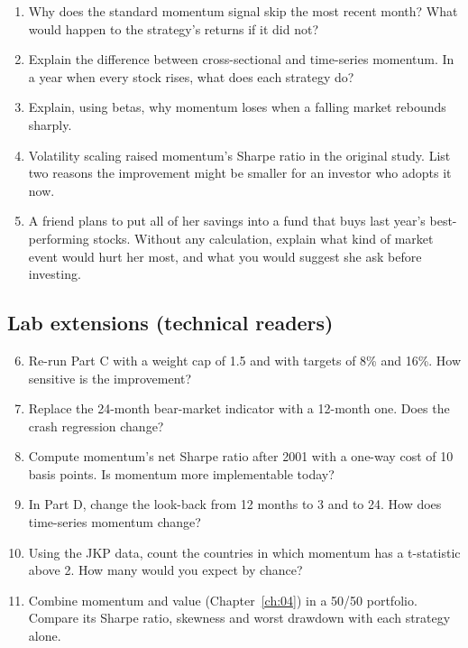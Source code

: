 \begin{enumerate}
  \item Why does the standard momentum signal skip the most recent month? What would happen to the strategy's returns if it did not?
  \item Explain the difference between cross-sectional and time-series momentum. In a year when every stock rises, what does each strategy do?
  \item Explain, using betas, why momentum loses when a falling market rebounds sharply.
  \item Volatility scaling raised momentum's Sharpe ratio in the original study. List two reasons the improvement might be smaller for an investor who adopts it now.
  \item A friend plans to put all of her savings into a fund that buys last year's best-performing stocks. Without any calculation, explain what kind of market event would hurt her most, and what you would suggest she ask before investing.
\end{enumerate}

\subsection*{Lab extensions (technical readers)}

\begin{enumerate}
  \setcounter{enumi}{5}
  \item Re-run Part C with a weight cap of 1.5 and with targets of 8\% and 16\%. How sensitive is the improvement?
  \item Replace the 24-month bear-market indicator with a 12-month one. Does the crash regression change?
  \item Compute momentum's net Sharpe ratio after 2001 with a one-way cost of 10 basis points. Is momentum more implementable today?
  \item In Part D, change the look-back from 12 months to 3 and to 24. How does time-series momentum change?
  \item Using the JKP data, count the countries in which momentum has a t-statistic above 2. How many would you expect by chance?
  \item Combine momentum and value (Chapter~\ref{ch:04}) in a 50/50 portfolio. Compare its Sharpe ratio, skewness and worst drawdown with each strategy alone.
\end{enumerate}

